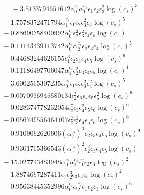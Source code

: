 \documentclass[10pt]{article}
\begin{document}
\begin{align*}
\phantom{F_{s,7}} &\phantom{={}}{}  - 3.5133794651612 \alpha_{0}^{c_s} \alpha_{1}^{c_s} \epsilon_{1} \epsilon_{2} \epsilon_{3}^{2} \log{\left(c_{s} \right)}^{3} \\
&{}  - 1.7578372471794 \alpha_{1}^{c_s} \epsilon_{1} \epsilon_{2} \epsilon_{3}^{2} \epsilon_{4} \log{\left(c_{s} \right)}^{5} \\
&{}  - 0.88690358400992 \alpha_{0}^{c_s} \epsilon_{2}^{2} \epsilon_{3}^{2} \epsilon_{4} \epsilon_{5} \log{\left(c_{s} \right)} \\
&{}  - 0.11143439113742 \alpha_{0}^{c_s} \alpha_{2}^{c_s} \epsilon_{2} \epsilon_{3} \epsilon_{4} \log{\left(c_{s} \right)}^{5} \\
&{}  - 0.44683244626155 \epsilon_{1}^{3} \epsilon_{2} \epsilon_{3} \epsilon_{4} \epsilon_{5} \log{\left(c_{s} \right)}^{6} \\
&{}  - 0.11186497706047 \alpha_{1}^{c_s} \epsilon_{2}^{2} \epsilon_{3} \epsilon_{4} \epsilon_{5} \log{\left(c_{s} \right)}^{4} \\
&{}  - 3.6002505307235 \alpha_{0}^{c_s} \epsilon_{1} \epsilon_{2} \epsilon_{3}^{2} \epsilon_{4}^{2} \log{\left(c_{s} \right)}^{5} \\
&{}  - 0.0070936945580134 \epsilon_{2}^{2} \epsilon_{3} \epsilon_{4} \epsilon_{5} \epsilon_{6}^{2} \log{\left(c_{s} \right)}^{6} \\
&{}  - 0.028374778232054 \epsilon_{2}^{2} \epsilon_{3} \epsilon_{4}^{2} \epsilon_{5} \epsilon_{6} \log{\left(c_{s} \right)}^{6} \\
&{}  - 0.056749556464107 \epsilon_{2}^{2} \epsilon_{3}^{2} \epsilon_{4} \epsilon_{5} \epsilon_{6} \log{\left(c_{s} \right)}^{6} \\
&{}  - 0.9109092620606 \left(\alpha_{0}^{c_s}\right)^{3} \epsilon_{2} \epsilon_{3} \epsilon_{4} \epsilon_{5} \log{\left(c_{s} \right)}^{3} \\
&{}  - 0.9301705366543 \left(\alpha_{0}^{c_s}\right)^{2} \epsilon_{2}^{2} \epsilon_{3} \epsilon_{4} \epsilon_{5} \log{\left(c_{s} \right)} \\
&{}  - 15.027743483948 \alpha_{0}^{c_s} \alpha_{1}^{c_s} \epsilon_{1}^{2} \epsilon_{2} \epsilon_{3} \log{\left(c_{s} \right)}^{2} \\
&{}  - 1.8874697287411 \epsilon_{1} \epsilon_{2}^{3} \epsilon_{3} \epsilon_{4} \epsilon_{5} \log{\left(c_{s} \right)}^{2} \\
&{}  - 0.95638445352996 \alpha_{0}^{c_s} \alpha_{2}^{c_s} \epsilon_{1} \epsilon_{2} \epsilon_{3} \log{\left(c_{s} \right)}^{6} \\

\end{align*}
\end{document}
